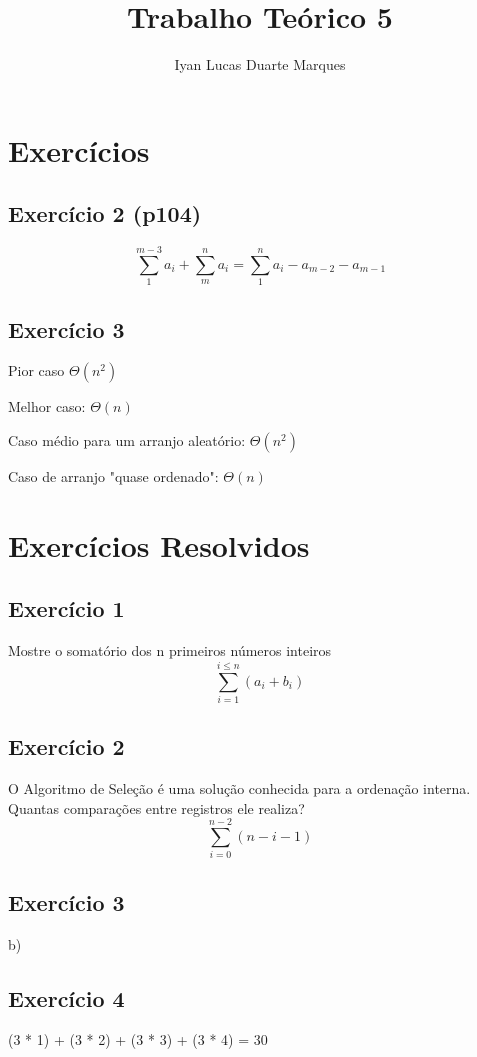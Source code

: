 \documentclass[12pt]{article}
\title{Trabalho Teórico 5}
\author{Iyan Lucas Duarte Marques}
\begin{document}
\maketitle
\section{Exercícios}
\subsection{Exercício 2 (p104)}
\begingroup
\LARGE
\begin{equation}
\sum_{1}^{m-3}a_i + \sum_{m}^{n}a_i = \sum_{1}^{n}a_i - a_{m-2} - a_{m-1}
\end{equation}
\endgroup
\subsection{Exercício 3}
Pior caso  $\Theta(n^2)$

Melhor caso: $\Theta(n)$

Caso médio para um arranjo aleatório: $\Theta(n^2)$

Caso de arranjo "quase ordenado": $\Theta(n)$
\section{Exercícios Resolvidos}
\subsection{Exercício 1}
Mostre o somatório dos n primeiros números inteiros
\begingroup
\LARGE
\begin{equation}
    \sum_{i=1}^{i\leq n}(a_i + b_i)
\end{equation}
\endgroup
\subsection{Exercício 2}
O Algoritmo de Seleção é uma solução conhecida para a ordenação
interna. Quantas comparações entre registros ele realiza?
\begingroup
\LARGE
\begin{equation}
    \sum_{i=0}^{n-2}(n-i-1)
\end{equation}
\endgroup
\subsection{Exercício 3}
\begingroup
\large

b)
\endgroup
\subsection{Exercício 4}
\begingroup
\large    
    (3 * 1) + (3 * 2) + (3 * 3) + (3 * 4) = 30
\endgroup
\end{document}
